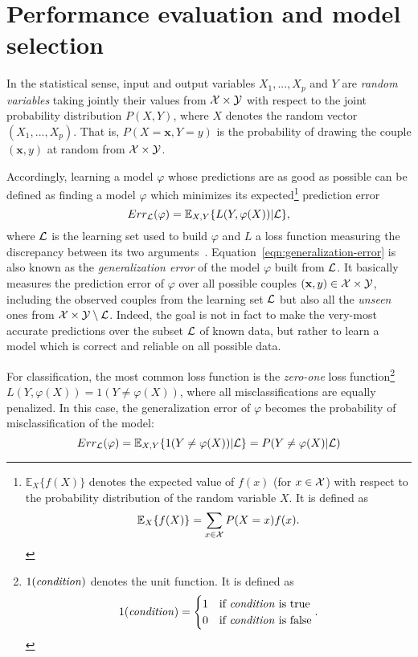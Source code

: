 \section{Performance evaluation and model selection}

In the statistical sense, input and output variables $X_1, ..., X_p$ and $Y$
are \textit{random variables} taking jointly their values from ${\cal X}
\times {\cal Y}$ with respect to the joint probability distribution $P(X, Y)$,
where $X$ denotes the random vector $(X_1, ..., X_p)$. That is,
$P(X=\mathbf{x}, Y=y)$ is the probability of drawing the couple $(\mathbf{x},
y)$ at random from ${\cal X} \times {\cal Y}$.

Accordingly, learning  a model $\varphi$ whose predictions are as good as
possible can be defined as finding a model $\varphi$ which minimizes its
expected\footnote{$\mathbb{E}_X \{f(X)\}$ denotes the expected value of $f(x)$
(for $x \in {\cal X}$) with respect to the probability distribution of the
random variable $X$. It is defined as $$\mathbb{E}_X \{f(X)\} = \sum_{x \in {\cal
X}} P(X=x) f(x).$$} prediction error
\begin{equation}\label{eqn:generalization-error}
Err_{{\cal L}}(\varphi) = \mathbb{E}_{X, Y}\{ L(Y, \varphi(X)) | {\cal L} \},
\end{equation}
where ${\cal L}$ is the learning set used to build $\varphi$ and $L$ a loss
function measuring the discrepancy between its two
arguments~\citep{geurts:2002}. Equation~\ref{eqn:generalization-error} is also
known as the \textit{generalization error} of the model $\varphi$ built from
${\cal L}$. It basically measures the prediction error of $\varphi$ over all
possible couples $(\mathbf{x}, y)\in {\cal X}\times{\cal Y}$, including the
observed couples from the learning set ${\cal L}$ but also all the
\textit{unseen} ones from ${\cal X}\times{\cal Y} \setminus {\cal L}$. Indeed,
the goal is not in fact to make the very-most accurate predictions over the
subset ${\cal L}$ of known data, but rather to learn a model which is correct
and reliable on all possible data.

For classification, the most common loss function is the \textit{zero-one} loss
function\footnote{$1(\text{\textit{condition}})$ denotes the unit function. It
is defined as
$$1(\text{\textit{condition}}) =
\begin{cases}
1 & \text{if \textit{condition} is true}\\
0 & \text{if \textit{condition} is false}
\end{cases}.
$$} $L(Y, \varphi(X)) = 1(Y \neq \varphi(X))$, where all
misclassifications are equally penalized. In this case, the generalization
error of $\varphi$ becomes the probability of misclassification of the model:
\begin{equation}
Err_{\cal L}(\varphi) = \mathbb{E}_{X, Y}\{ 1(Y \neq \varphi(X)) | {\cal L} \} = P(Y \neq \varphi(X)|{\cal L})
\end{equation}


